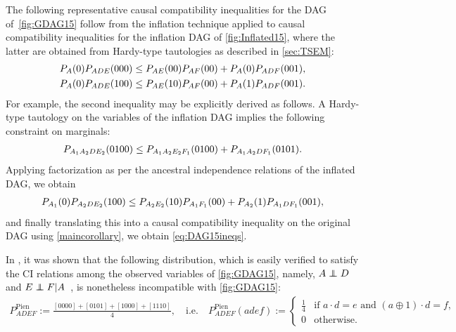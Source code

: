 {The following representative causal compatibility inequalities for the DAG of~\cref{fig:GDAG15} follow from the inflation technique applied to causal compatibility inequalities for the inflation DAG of \cref{fig:Inflated15}, where the latter are obtained from Hardy-type tautologies as described in \cref{sec:TSEM}:
\begin{align}
\p[A]{0} \p[A D E]{0 0 0} \leq {\p[A E]{0 0} \p[A F]{0 0}  + \p[A]{0} \p[A D F]{0 0 1}}, \\
\p[A]{0}\p[A D E]{1 0 0} \leq {\p[A E]{1 0} \p[A F]{0 0} + \p[A]{1} \p[A D F]{0 0 1}}.
\label{eq:DAG15ineqs}
\end{align}
For example, the second inequality may be explicitly derived as follows. A Hardy-type tautology on the variables of the inflation DAG implies the following constraint on marginals:
\begin{align}\label{eq:hardyforpienaar}
     \pdf[A_1 A_2 D E_2]{0100} \leq \pdf[A_1 A_2 E_2 F_1]{0100} + \pdf[A_1 A_2 D F_1]{0101} .
\end{align}
Applying factorization as per the ancestral independence relations of the inflated DAG, we obtain 
\begin{align}
 \p[A_1]{0} \p[A_2 D E_2]{100} \leq \p[A_2 E_2]{10} \p[A_1 F_1]{00} + \p[A_2]{1} \p[A_1 D F_1]{001},   
\end{align}
and finally translating this into a causal compatibility inequality on the original DAG using \cref{maincorollary}, we obtain \cref{eq:DAG15ineqs}. 
 
In \citet{pianaar2016interesting}, it was shown that the following distribution, which is easily verified to satisfy the CI relations among the observed variables of \cref{fig:GDAG15}, namely, $A\indep D$ and $E\indep F | A$~\cite{pusey2014gdag}, is nonetheless incompatible with \cref{fig:GDAG15}:
\begin{align}\label{eq:pienaardistro}
	P^{\text{Pien}}_{A D E F}:=\frac{[0000]+[0101]+[1000]+[1110]}{4},\quad\text{i.e.}\quad P^{\text{Pien}}_{A D E F}(a d e f):=\begin{cases}\tfrac{1}{4}&\text{if }  a\cdot d = e \text{ and }  (a \oplus 1)\cdot d = f, \\ 0&\text{otherwise}.\end{cases}
\end{align}

}
